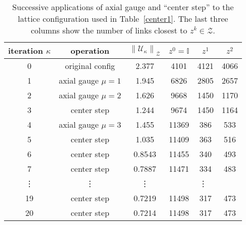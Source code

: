 \documentclass[preprint,aps,prd]{revtex4-2}
\newcommand{\zentrum}{\mathcal{Z}}       %
\newcommand{\config}{\mathcal{U}}
\begin{document}
\begin{table}
  \caption{Successive applications of axial gauge
    and ``center step'' to the lattice configuration
    used in Table~\ref{center1}.
    The last three columns show the number of links closest
    to $z^k \in \zentrum$.
    \label{center3}}
  \begin{tabular}{c|c|c|ccc}
    iteration $\kappa$ & operation & $\left\lVert \config_\kappa \right\rVert_\zentrum$
     & $z^0=\mathbb{I}$ & $z^1$ & $z^2$ \\
    \hline
    0 & original config    & 2.377  & 4101 & 4121 & 4066\\
    1 & axial gauge $\mu=1$& 1.945  & 6826 & 2805 & 2657\\
    2 & axial gauge $\mu=2$& 1.626  & 9668 & 1450 & 1170\\
    3 & center step        & 1.244  & 9674 & 1450 & 1164\\
    4 & axial gauge $\mu=3$& 1.455  & 11369 & 386 & 533\\
    5 & center step        & 1.035  & 11409 & 363 & 516\\
    6 & center step        & 0.8543 & 11455 & 340 & 493\\
    7 & center step        & 0.7887 & 11471 & 334 & 483\\
    \vdots & \vdots & \vdots & \multicolumn{3}{c}{\vdots}\\
    19 & center step       & 0.7219 & 11498 & 317 & 473\\
    20 & center step       & 0.7214 & 11498 & 317 & 473\\
  \end{tabular}
  \end{table}
\end{document}
